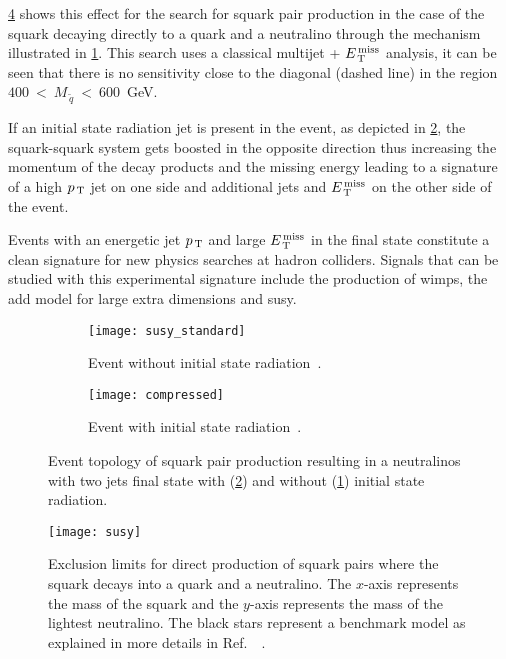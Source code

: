 \cref{fig:susy_exclusion} shows this effect for the search for squark pair
production in the case of the squark decaying directly to a quark and a
neutralino through the mechanism illustrated in \cref{fig:susy_standard}. This
search uses a classical multijet + $E_\mathrm{\, T}^\mathrm{\, miss}$ analysis, it can be seen that there is
no sensitivity close to the diagonal (dashed line) in the region
$400~<~M_{\, \tilde{q}}~<~600$~GeV.

If an initial state radiation jet is present in the event, as depicted in
\cref{fig:susy_compressed}, the squark-squark system gets boosted in the
opposite direction thus increasing the momentum of the decay products and the
missing energy leading to a signature of a high $p_\mathrm{\, T}$ jet on one side and
additional jets and $E_\mathrm{\, T}^\mathrm{\, miss}$ on the other side of the event.

Events with an energetic jet $p_\mathrm{\, T}$ and large $E_\mathrm{\, T}^\mathrm{\, miss}$ in the final state
constitute a clean signature for new physics searches at hadron colliders.
Signals that can be studied with this experimental signature include the
production of \glspl{wimp}, the \gls{add} model for large extra dimensions and
\gls{susy}.
\begin{figure}[!h]
  \centering
  \begin{subfigure}[t]{.48\linewidth}
    \texttt{[image: susy\_standard]}
    \caption{Event without initial state radiation~\cite{SUSYPub}.}
    \label{fig:susy_standard}
  \end{subfigure} \quad
  \begin{subfigure}[t]{.48\linewidth}
    \texttt{[image: compressed]}
    \caption{Event with initial state radiation~\cite{ExotPub}.}
    \label{fig:susy_compressed}
  \end{subfigure}
  \caption{Event topology of squark pair production resulting in a neutralinos
    with two jets final state with (\cref{fig:susy_compressed}) and without
    (\cref{fig:susy_standard}) initial state radiation.}
  \label{fig:motivation}
\end{figure}
\begin{figure}[!h]
  \centering
  \texttt{[image: susy]}
  \caption{Exclusion limits for direct production of squark
    pairs where the squark decays into a quark and a neutralino. The $x$-axis
    represents the mass of the squark and the $y$-axis represents the mass of
    the lightest neutralino. The black stars represent a benchmark model as
    explained in more details in Ref.~~\cite{SUSYPub}.}
  \label{fig:susy_exclusion}
\end{figure}

